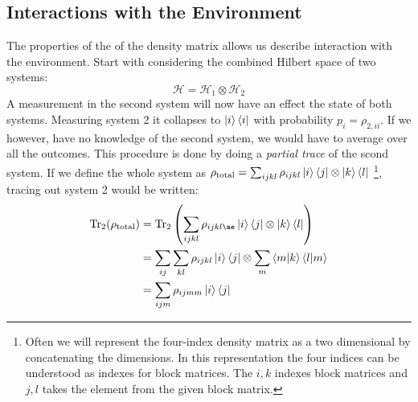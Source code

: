\subsection{Interactions with the Environment}\label{sec:density_with_env}
The properties of the of the density matrix allows us describe interaction with the environment. Start with considering the combined Hilbert space of two systems:
\begin{equation}
    \mathcal{H} = \mathcal{H}_1 \otimes \mathcal{H}_2
\end{equation}
A measurement in the second system will now have an effect the state of both systems. Measuring system 2 it collapses to $\ket{i}\bra{i}$ with probability $p_i = \rho_{2, ii}$. If we however, have no knowledge of the second system, we would have to average over all the outcomes. This procedure is done by doing a \textit{partial trace} of the scond system. If we define the whole system as $\rho_{\text{total}} = \sum_{ijkl}\rho_{ijkl}\ket{i}\bra{j}\otimes\ket{k}\bra{l}$ \footnote{Often we will represent the four-index density matrix as a two dimensional by concatenating the dimensions. In this representation the four indices can be understood as indexes for block matrices. The $i, k$ indexes block matrices and $j, l$ takes the element from the given block matrix.}, tracing out system 2 would be written:
\begin{align}
    \Tr_2 (\rho_{\text{total}})   &= \Tr_2 \left(\sum_{ijkl} \rho_{ijklæ} \ket{i}\bra{j} \otimes \ket{k}\bra{l}\right) \nonumber \\
                                    &= \sum_{ij}\sum_{kl} \rho_{ijkl} \ket{i}\bra{j} \otimes \sum_m \bra{m}  \ket{k}\bra{l}\ket{m} \nonumber \\
    &= \sum_{ijm} \rho_{ijmm} \ket{i}\bra{j}
\end{align}
